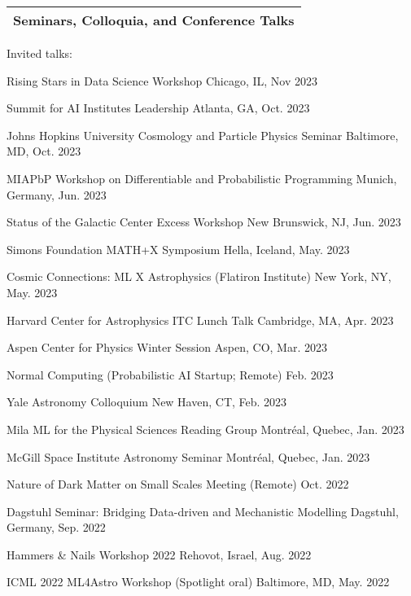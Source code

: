 \documentclass[letterpaper,11pt]{article}
\newenvironment{packed_itemize}{
\begin{itemize}[label=\raisebox{0.25ex}{\tiny$\bullet$}]
  \setlength{\itemsep}{4.2pt}
  \setlength{\parskip}{0pt}
  \setlength{\parsep}{0pt}}{\end{itemize}
}
\begin{document}


\noindent
\begin{tabular*}{\textwidth}{l@{\extracolsep{\fill}}}
\large {\sc \Large{Seminars, Colloquia, and Conference Talks}}\\
\hline
\end{tabular*}\vspace{3.5mm}

\noindent
Invited talks:
\begin{packed_itemize}
  \item Rising Stars in Data Science Workshop \hfill Chicago, IL, Nov 2023
  \item Summit for AI Institutes Leadership \hfill Atlanta, GA, Oct. 2023
  \item Johns Hopkins University Cosmology and Particle Physics Seminar \hfill Baltimore, MD, Oct. 2023
  \item MIAPbP Workshop on Differentiable and Probabilistic Programming \hfill Munich, Germany, Jun. 2023
  \item Status of the Galactic Center Excess Workshop \hfill New Brunswick, NJ, Jun. 2023
  \item Simons Foundation MATH+X Symposium \hfill Hella, Iceland, May. 2023
  \item Cosmic Connections: ML X Astrophysics (Flatiron Institute) \hfill New York, NY, May. 2023
  \item Harvard Center for Astrophysics ITC Lunch Talk  \hfill Cambridge, MA, Apr. 2023
  \item Aspen Center for Physics Winter Session \hfill Aspen, CO, Mar. 2023
  \item Normal Computing (Probabilistic AI Startup; Remote) \hfill Feb. 2023
  \item Yale Astronomy Colloquium \hfill New Haven, CT, Feb. 2023
  \item Mila ML for the Physical Sciences Reading Group \hfill Montr\'eal, Quebec, Jan. 2023
  \item McGill Space Institute Astronomy Seminar \hfill Montr\'eal, Quebec, Jan. 2023
  \item Nature of Dark Matter on Small Scales Meeting (Remote) \hfill  Oct. 2022
  \item Dagstuhl Seminar: Bridging Data-driven and Mechanistic Modelling \hfill Dagstuhl, Germany, Sep. 2022
  \item Hammers \& Nails Workshop 2022 \hfill Rehovot, Israel, Aug. 2022
  \item ICML 2022 ML4Astro Workshop (Spotlight oral) \hfill Baltimore, MD, May. 2022

\end{packed_itemize}
\end{document}
